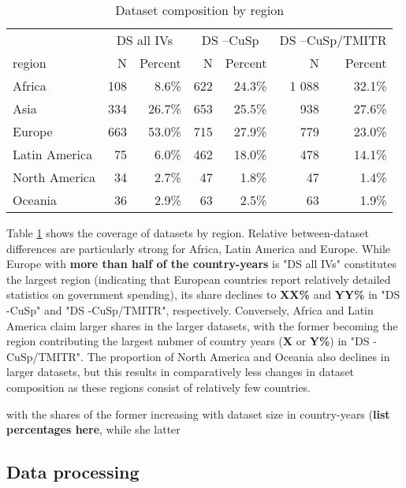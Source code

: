 \documentclass[11pt]{article}
\begin{document}
\begin{table}[ht]
\centering
\begin{tabular}{p{2.5cm}rrrrrr}
  \hline 
 & \multicolumn{2}{c}{DS all IVs} & \multicolumn{2}{c}{DS --CuSp} & \multicolumn{2}{c}{DS --CuSp/TMITR} \\ 
\cmidrule(r){2-3}\cmidrule(r){4-5}\cmidrule(r){6-7} 
 region & N & Percent & N & Percent & N & Percent \\ 
  \hline
Africa & 108 &  8.6\% & 622 & 24.3\% & 1 088 & 32.1\% \\ 
  Asia & 334 & 26.7\% & 653 & 25.5\% & 938 & 27.6\% \\ 
  Europe & 663 & 53.0\% & 715 & 27.9\% & 779 & 23.0\% \\ 
  Latin America & 75 &  6.0\% & 462 & 18.0\% & 478 & 14.1\% \\ 
  North America & 34 &  2.7\% & 47 &  1.8\% & 47 &  1.4\% \\ 
  Oceania & 36 &  2.9\% & 63 &  2.5\% & 63 &  1.9\% \\ 
   \hline
\end{tabular}
\caption{Dataset composition by region} 
\label{tbl:cbn_cpsgn}
\end{table}


Table \ref{tbl:cbn_cpsgn} shows the coverage of datasets by region. 
Relative between-dataset differences are particularly strong for Africa, Latin America and Europe.
While Europe with \textbf{more than half of the country-years} is "DS all IVs" constitutes the largest region (indicating that European countries report relatively detailed statistics on government spending), its share declines to \textbf{XX\%} and \textbf{YY\%} in "DS -CuSp" and "DS -CuSp/TMITR", respectively.
Conversely, Africa and Latin America claim larger shares in the larger datasets, with the former becoming the region contributing the largest nubmer of country years (\textbf{X} or \textbf{Y\%}) in "DS -CuSp/TMITR".
The proportion of North America and Oceania also declines in larger datasets, but this results in comparatively less changes in dataset composition as these regions consist of relatively few countries. 



with the shares of the former increasing with dataset size in country-years (\textbf{list percentages here}, while she latter 





\subsection{Data processing}
\label{app_data_processing}
\end{document}
